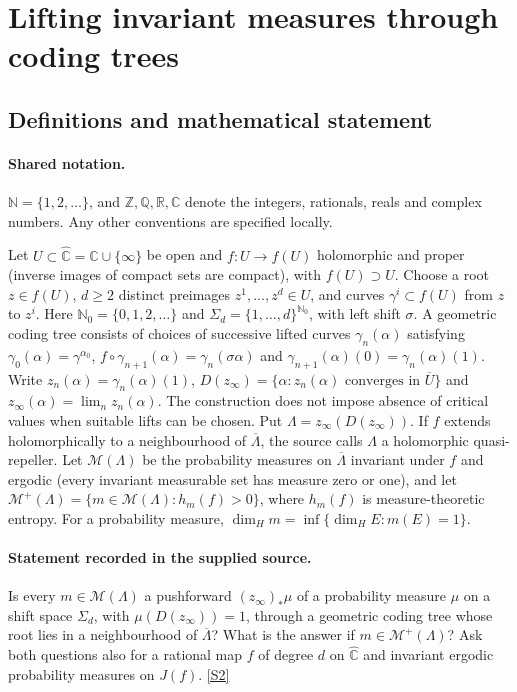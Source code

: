 \documentclass[11pt]{article}
\newcommand{\sref}[2]{\hyperlink{source:#1:#2}{[S#2]}}
\begin{document}
\section{Lifting invariant measures through coding trees}\label{statement}

\subsection{Definitions and mathematical statement}

\paragraph{Shared notation.}$\mathbb N=\{1,2,\ldots\}$, and $\mathbb Z,\mathbb Q,\mathbb R,\mathbb C$ denote the integers, rationals, reals and complex numbers. Any other conventions are specified locally.


Let $U\subset\widehat{\mathbb C}=\mathbb C\cup\{\infty\}$ be open and $f:U\to f(U)$ holomorphic and proper (inverse images of compact sets are compact), with $f(U)\supset U$. Choose a root $z\in f(U)$, $d\geq2$ distinct preimages $z^1,\ldots,z^d\in U$, and curves $\gamma^i\subset f(U)$ from $z$ to $z^i$. Here $\mathbb N_0=\{0,1,2,\ldots\}$ and $\Sigma_d=\{1,\ldots,d\}^{\mathbb N_0}$, with left shift $\sigma$. A geometric coding tree consists of choices of successive lifted curves $\gamma_n(\alpha)$ satisfying $\gamma_0(\alpha)=\gamma^{\alpha_0}$, $f\circ\gamma_{n+1}(\alpha)=\gamma_n(\sigma\alpha)$ and $\gamma_{n+1}(\alpha)(0)=\gamma_n(\alpha)(1)$. Write $z_n(\alpha)=\gamma_n(\alpha)(1)$, $D(z_\infty)=\{\alpha:z_n(\alpha)\text{ converges in }\overline U\}$ and $z_\infty(\alpha)=\lim_n z_n(\alpha)$. The construction does not impose absence of critical values when suitable lifts can be chosen. Put $\Lambda=z_\infty(D(z_\infty))$. If $f$ extends holomorphically to a neighbourhood of $\overline\Lambda$, the source calls $\Lambda$ a holomorphic quasi-repeller. Let $\mathcal M(\Lambda)$ be the probability measures on $\overline\Lambda$ invariant under $f$ and ergodic (every invariant measurable set has measure zero or one), and let $\mathcal M^+(\Lambda)=\{m\in\mathcal M(\Lambda):h_m(f)>0\}$, where $h_m(f)$ is measure-theoretic entropy. For a probability measure, $\dim_Hm=\inf\{\dim_HE:m(E)=1\}$.
\paragraph{Statement recorded in the supplied source.}
Is every $m\in\mathcal M(\Lambda)$ a pushforward $(z_\infty)_*\mu$ of a probability measure $\mu$ on a shift space $\Sigma_d$, with $\mu(D(z_\infty))=1$, through a geometric coding tree whose root lies in a neighbourhood of $\overline\Lambda$? What is the answer if $m\in\mathcal M^+(\Lambda)$? Ask both questions also for a rational map $f$ of degree $d$ on $\widehat{\mathbb C}$ and invariant ergodic probability measures on $J(f)$. \sref{statement}{2}
\end{document}
